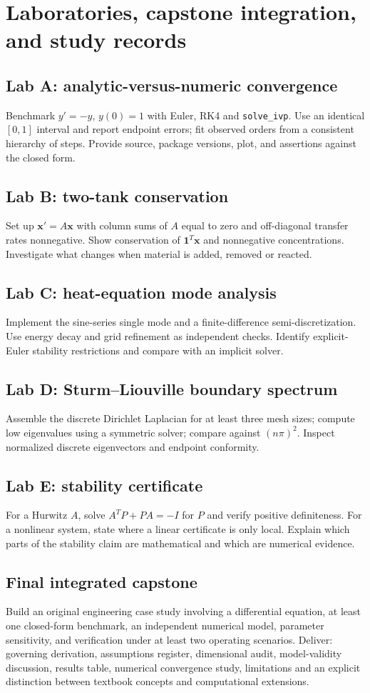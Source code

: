 \documentclass[11pt,letterpaper,oneside]{report}
\theoremstyle{definition}\newtheorem{definition}[theorem]{Definition}
\theoremstyle{remark}\newtheorem{remark}[theorem]{Remark}
\begin{document}
\chapter{Laboratories, capstone integration, and study records}
\section{Lab A: analytic-versus-numeric convergence}
Benchmark $y'=-y$, $y(0)=1$ with Euler, RK4 and \texttt{solve\_ivp}. Use an identical $[0,1]$ interval and report endpoint errors; fit observed orders from a consistent hierarchy of steps. Provide source, package versions, plot, and assertions against the closed form.
\section{Lab B: two-tank conservation}
Set up $\mathbf x'=A\mathbf x$ with column sums of $A$ equal to zero and off-diagonal transfer rates nonnegative. Show conservation of $\mathbf 1^T\mathbf x$ and nonnegative concentrations. Investigate what changes when material is added, removed or reacted.
\section{Lab C: heat-equation mode analysis}
Implement the sine-series single mode and a finite-difference semi-discretization. Use energy decay and grid refinement as independent checks. Identify explicit-Euler stability restrictions and compare with an implicit solver.
\section{Lab D: Sturm--Liouville boundary spectrum}
Assemble the discrete Dirichlet Laplacian for at least three mesh sizes; compute low eigenvalues using a symmetric solver; compare against $(n\pi)^2$. Inspect normalized discrete eigenvectors and endpoint conformity.
\section{Lab E: stability certificate}
For a Hurwitz $A$, solve $A^TP+PA=-I$ for $P$ and verify positive definiteness. For a nonlinear system, state where a linear certificate is only local. Explain which parts of the stability claim are mathematical and which are numerical evidence.
\section{Final integrated capstone}
Build an original engineering case study involving a differential equation, at least one closed-form benchmark, an independent numerical model, parameter sensitivity, and verification under at least two operating scenarios. Deliver: governing derivation, assumptions register, dimensional audit, model-validity discussion, results table, numerical convergence study, limitations and an explicit distinction between textbook concepts and computational extensions.
\end{document}
